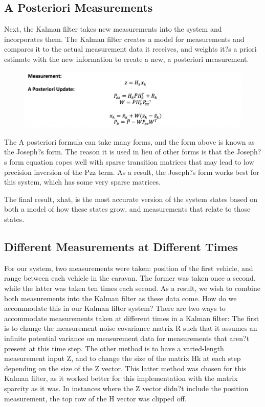 \documentclass[12pt,onecolumn,reqno]{amsart}
\begin{document}
\subsection{A Posteriori Measurements}
Next, the Kalman filter takes new measurements into the system and incorporates them. The Kalman filter creates a model for measurements and compares it to the actual measurement data it receives, and weights it?s a priori estimate with the new information to create a new, a posteriori measurement.

\begin{figure}[H]
	\includegraphics{a_post.png}
	\label{fig:A Posteriori Measurements}
\end{figure}

The A posteriori formula can take many forms, and the form above is known as the Joseph?s form. The reason it is used in lieu of other forms is that the Joseph?s form equation copes well with sparse transition matrices that may lead to low precision inversion of the Pzz term. As a result, the Joseph?s form works best for this system, which has some very sparse matrices.

The final result, xhat, is the most accurate version of the system states based on both a model of how these states grow, and measurements that relate to those states.

\subsection{Different Measurements at Different Times}
For our system, two measurements were taken: position of the first vehicle, and range between each vehicle in the caravan. The former was taken once a second, while the latter was taken ten times each second. As a result, we wish to combine both measurements into the Kalman filter as these data come. How do we accommodate this in our Kalman filter system? There are two ways to accommodate measurements taken at different times in a Kalman filter: The first is to change the measurement noise covariance matrix R such that it assumes an infinite potential variance on measurement data for measurements that aren?t present at this time step. The other method is to have a varied-length measurement input Z, and to change the size of the matrix Hk at each step depending on the size of the Z vector. This latter method was chosen for this Kalman filter, as it worked better for this implementation with the matrix sparcity as it was. In instances where the Z vector didn?t include the position measurement, the top row of the H vector was clipped off.
\end{document}
